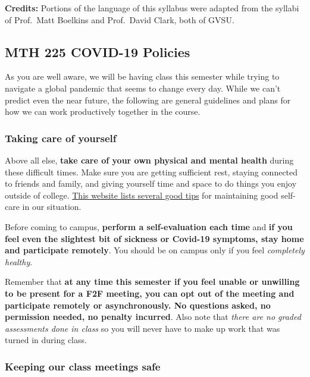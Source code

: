 \documentclass[]{article}
\begin{document}
\textbf{Credits:} Portions of the language of this syllabus were adapted
from the syllabi of Prof.~Matt Boelkins and Prof.~David Clark, both of
GVSU.

\hypertarget{mth-225-covid-19-policies}{%
\subsection{MTH 225 COVID-19 Policies}\label{mth-225-covid-19-policies}}

As you are well aware, we will be having class this semester while
trying to navigate a global pandemic that seems to change every day.
While we can't predict even the near future, the following are general
guidelines and plans for how we can work productively together in the
course.

\hypertarget{taking-care-of-yourself}{%
\subsubsection{Taking care of yourself}\label{taking-care-of-yourself}}

Above all else, \textbf{take care of your own physical and mental
health} during these difficult times. Make sure you are getting
sufficient rest, staying connected to friends and family, and giving
yourself time and space to do things you enjoy outside of college.
\href{https://www.mayoclinichealthsystem.org/hometown-health/speaking-of-health/self-care-tips-during-the-covid-19-pandemic}{This
website lists several good tips} for maintaining good self-care in our
situation.

Before coming to campus, \textbf{perform a self-evaluation each time}
and \textbf{if you feel even the slightest bit of sickness or Covid-19
symptoms, stay home and participate remotely}. You should be on campus
only if you feel \emph{completely healthy}.

Remember that \textbf{at any time this semester if you feel unable or
unwilling to be present for a F2F meeting, you can opt out of the
meeting and participate remotely or asynchronously. No questions asked,
no permission needed, no penalty incurred}. Also note that \emph{there
are no graded assessments done in class} so you will never have to make
up work that was turned in during class.

\hypertarget{keeping-our-class-meetings-safe}{%
\subsubsection{Keeping our class meetings
safe}\label{keeping-our-class-meetings-safe}}
\end{document}
